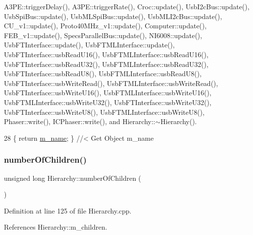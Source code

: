 A3\+P\+E\+::trigger\+Delay(), A3\+P\+E\+::trigger\+Rate(), Croc\+::update(), Usb\+I2c\+Bus\+::update(), Usb\+Spi\+Bus\+::update(), Usb\+M\+L\+Spi\+Bus\+::update(), Usb\+M\+L\+I2c\+Bus\+::update(), C\+U\+\_\+v1\+::update(), Proto40\+M\+Hz\+\_\+v1\+::update(), Computer\+::update(), F\+E\+B\+\_\+v1\+::update(), Specs\+Parallel\+Bus\+::update(), N\+I6008\+::update(), Usb\+F\+T\+Interface\+::update(), Usb\+F\+T\+M\+L\+Interface\+::update(), Usb\+F\+T\+Interface\+::usb\+Read\+U16(), Usb\+F\+T\+M\+L\+Interface\+::usb\+Read\+U16(), Usb\+F\+T\+Interface\+::usb\+Read\+U32(), Usb\+F\+T\+M\+L\+Interface\+::usb\+Read\+U32(), Usb\+F\+T\+Interface\+::usb\+Read\+U8(), Usb\+F\+T\+M\+L\+Interface\+::usb\+Read\+U8(), Usb\+F\+T\+Interface\+::usb\+Write\+Read(), Usb\+F\+T\+M\+L\+Interface\+::usb\+Write\+Read(), Usb\+F\+T\+Interface\+::usb\+Write\+U16(), Usb\+F\+T\+M\+L\+Interface\+::usb\+Write\+U16(), Usb\+F\+T\+M\+L\+Interface\+::usb\+Write\+U32(), Usb\+F\+T\+Interface\+::usb\+Write\+U32(), Usb\+F\+T\+Interface\+::usb\+Write\+U8(), Usb\+F\+T\+M\+L\+Interface\+::usb\+Write\+U8(), Phaser\+::write(), I\+C\+Phaser\+::write(), and Hierarchy\+::$\sim$\+Hierarchy().


\begin{DoxyCode}
28 \{ \textcolor{keywordflow}{return} \hyperlink{classObject_a8b83c95c705d2c3ba0d081fe1710f48d}{m\_name}; \} \textcolor{comment}{//< Get Object m\_name}
\end{DoxyCode}
\mbox{\label{classHierarchy_ab16e84de65fd84e14001a6cf941c8be4}} 
\subsubsection{\texorpdfstring{number\+Of\+Children()}{numberOfChildren()}}
{\footnotesize\ttfamily unsigned long Hierarchy\+::number\+Of\+Children (\begin{DoxyParamCaption}{ }\end{DoxyParamCaption})\hspace{0.3cm}{\ttfamily [inherited]}}



Definition at line 125 of file Hierarchy.\+cpp.



References Hierarchy\+::m\+\_\+children.



